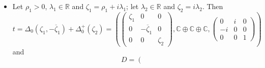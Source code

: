 \documentclass{article}
\theoremstyle{definition}
\newcommand{\R}{\mathbb{R}}
\newcommand{\C}{\mathbb{C}}
\newenvironment{smallpmatrix}{\left(\begin{smallmatrix}}{\end{smallmatrix}\right)}
\begin{document}
\begin{itemize}
$$\begin{pmatrix}
        0&0&\zeta_3
    \end{pmatrix},\C\oplus\C\oplus\C,\begin{pmatrix}
        1&0&0\\
        0&1&0\\
        0&0&-1
    \end{pmatrix}\right)$$ and \begin{equation}\label{8d_noniso_(2,1)-II}
        D=\left(\begin{smallmatrix}
        0 & \lambda_{1} & 0 & 0 & 0 & 0 & 0 \\
        -\lambda_{1} & 0 & 0 & 0 & 0 & 0 & 0 \\
        0 & 0 & 0 & \lambda_{2} & 0 & 0 & 0 \\
        0 & 0 & -\lambda_{2} & 0 & 0 & 0 & 0 \\
        0 & 0 & 0 & 0 & 0 & \lambda_{3} & 0 \\
        0 & 0 & 0 & 0 & -\lambda_{3} & 0 & 0 \\
        0 & 0 & 0 & 0 & 0 & 0 & a
    \end{smallmatrix}\right),\quad g(t)=\begin{smallpmatrix}
        1 & 0 & 0 & 0 & 0 & 0 \\
        0 & 1 & 0 & 0 & 0 & 0 \\
        0 & 0 & 1 & 0 & 0 & 0 \\
        0 & 0 & 0 & 1 & 0 & 0 \\
        0 & 0 & 0 & 0 & -1 & 0 \\
        0 & 0 & 0 & 0 & 0 & -1
    \end{smallpmatrix}.\end{equation}
    \item Let $\rho_1>0$, $\lambda_1\in\R$ and $\zeta_1=\rho_1+i\lambda_1$; let $\lambda_2\in\R$ and $\zeta_2=i\lambda_2$. Then $$t=\Delta_0(\zeta_1,-\overline{\zeta}_1)+\Delta_0^+(\zeta_2)=\left(\begin{pmatrix}
        \zeta_1&0&0\\
        0&-\overline{\zeta}_1&0\\
        0&0&\zeta_2
    \end{pmatrix},\C\oplus\C\oplus\C,\begin{pmatrix}
        0&i&0\\
        -i&0&0\\
        0&0&1
    \end{pmatrix}\right)$$ and \begin{equation}\label{8d_noniso_(2,1)-III}
        D=\left(\begin{smallmatrix}

\end{smallmatrix}
\end{equation}
\end{itemize}
\end{document}
